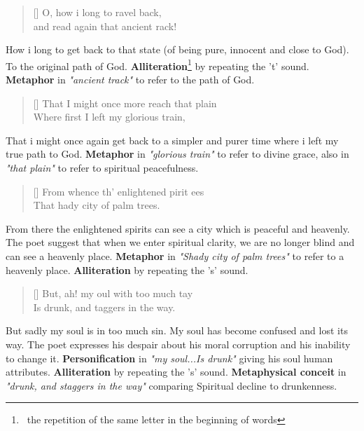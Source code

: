 \begin{verse}[\versewidth]
{\fontverse
O, how i long to ravel back,\\
and read again that ancient rack!
} 
\end{verse}

How i long to get back to that state (of being pure, innocent and close to God).
To the original path of God. \textbf{Alliteration}\footnote{\, 
the repetition of the same letter in the beginning of words} by repeating the 't' sound.
\textbf{Metaphor} in \textit{"ancient track"} to refer to the path of God.

\begin{verse}[\versewidth]
{\fontverse
That I might once more reach that plain\\
Where first I left my glorious train, 
} 
\end{verse}

That i might once again get back to a simpler and purer time
where i left my true path to God. \textbf{Metaphor} in \textit{"glorious train"} 
to refer to divine grace, also in \textit{"that plain"} to refer to spiritual peacefulness.

\newpage
\begin{verse}[\versewidth]
{\fontverse
From whence th’ enlightened pirit ees\\
That hady city of palm trees.
} 
\end{verse}

From there the enlightened spirits can see a city which is peaceful and heavenly.
The poet suggest that when we enter spiritual clarity, we are no longer blind
and can see a heavenly place. \textbf{Metaphor} in \textit{"Shady city of palm trees"} to refer
to a heavenly place. \textbf{Alliteration} by repeating the 's' sound.

\begin{verse}[\versewidth]
{\fontverse
But, ah! my oul with too much tay\\
Is drunk, and taggers in the way. 
} 
\end{verse}

But sadly my soul is in too much sin. My soul has become confused 
and lost its way. The poet expresses his despair about his moral corruption
and his inability to change it. \textbf{Personification} in \textit{"my soul...Is drunk"} 
giving his soul human attributes. \textbf{Alliteration} by repeating the 's' sound. 
\textbf{Metaphysical conceit} in \textit{"drunk, and staggers in the way"} 
comparing Spiritual decline to drunkenness.



